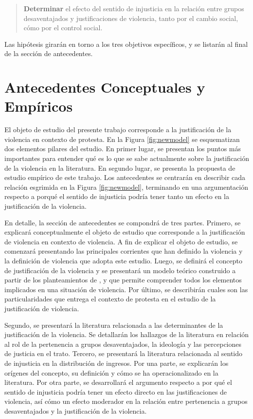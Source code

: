 \documentclass[12pt,twoside]{templates/facsothesis}
\begin{document}
\begin{quote}
\textbf{Determinar} el efecto del sentido de injusticia en la relación entre grupos desaventajados y justificaciones de violencia, tanto por el cambio social, cómo por el control social.
\end{quote}

Las hipótesis girarán en torno a los tres objetivos específicos, y se listarán al final de la sección de antecedentes.

\hypertarget{antecedentes-conceptuales-y-empuxedricos}{%
\chapter{Antecedentes Conceptuales y Empíricos}\label{antecedentes-conceptuales-y-empuxedricos}}

El objeto de estudio del presente trabajo corresponde a la justificación de la violencia en contexto de protesta. En la Figura \ref{fig:newmodel} se esquematizan dos elementos pilares del estudio. En primer lugar, se presentan los puntos más importantes para entender qué es lo que se sabe actualmente sobre la justificación de la violencia en la literatura. En segundo lugar, se presenta la propuesta de estudio empírico de este trabajo. Los antecedentes se centrarán en describir cada relación esgrimida en la Figura \ref{fig:newmodel}, terminando en una argumentación respecto a porqué el sentido de injusticia podría tener tanto un efecto en la justificación de la violencia.

En detalle, la sección de antecedentes se compondrá de tres partes. Primero, se explicará conceptualmente el objeto de estudio que corresponde a la justificación de violencia en contexto de violencia. A fin de explicar el objeto de estudio, se comenzará presentando las principales corrientes que han definido la violencia y la definición de violencia que adopta este estudio. Luego, se definirá el concepto de justificación de la violencia y se presentará un modelo teórico construido a partir de los planteamientos de \citet{Imbusch2005}, \citet{Jasso2016} y \citet{Riches1986} que permite comprender todos los elementos implicados en una situación de violencia. Por último, se describirán cuales son las particularidades que entrega el contexto de protesta en el estudio de la justificación de violencia.

Segundo, se presentará la literatura relacionada a las determinantes de la justificación de la violencia. Se detallarán los hallazgos de la literatura en relación al rol de la pertenencia a grupos desaventajados, la ideología y las percepciones de justicia en el trato. Tercero, se presentará la literatura relacionada al sentido de injusticia en la distribución de ingresos. Por una parte, se explicarán los orígenes del concepto, su definición y cómo se ha operacionalizado en la literatura. Por otra parte, se desarrollará el argumento respecto a por qué el sentido de injusticia podría tener un efecto directo en las justificaciones de violencia, así cómo un efecto moderador en la relación entre pertenencia a grupos desaventajados y la justificación de la violencia.
\end{document}
